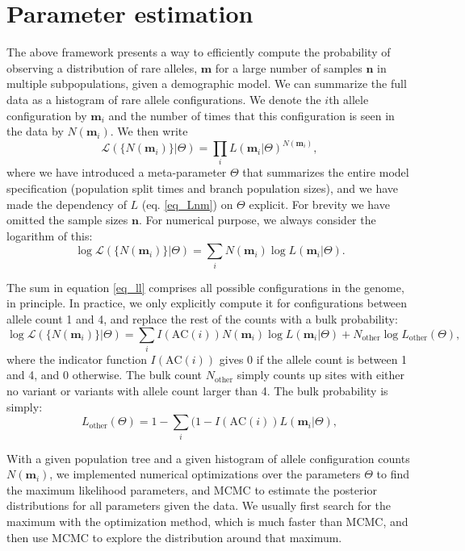 \documentclass[a4paper]{article}
\begin{document}
\section{Parameter estimation}
The above framework presents a way to efficiently compute the probability of observing a distribution of rare alleles, $\mathbf{m}$ for a large number of samples $\mathbf{n}$ in multiple subpopulations, given a demographic model. We can summarize the full data as a histogram of rare allele configurations. We denote the $i$th allele configuration by $\mathbf{m}_i$ and the number of times that this configuration is seen in the data by $N(\mathbf{m}_i)$. We then write
\begin{equation}
	\mathcal{L}(\{N(\mathbf{m}_i)\}|\Theta) = \prod_i L(\mathbf{m}_i|\Theta)^{N(\mathbf{m}_i)},
\end{equation}
where we have introduced a meta-parameter $\Theta$ that summarizes the entire model specification (population split times and branch population sizes), and we have made the dependency of $L$ (eq. \ref{eq_Lnm}) on $\Theta$ explicit. For brevity we have omitted the sample sizes $\mathbf{n}$. For numerical purpose, we always consider the logarithm of this:
\begin{equation}
    \label{eq_ll}
	\log\mathcal{L}(\{N(\mathbf{m}_i)\}|\Theta) = \sum_i N(\mathbf{m}_i) \log L(\mathbf{m}_i|\Theta).
\end{equation}

The sum in equation \ref{eq_ll} comprises all possible configurations in the genome, in principle. In practice, we only explicitly compute it for configurations between allele count 1 and 4, and replace the rest of the counts with a bulk probability:
\begin{equation}
    \label{eq_ll2}
	\log\mathcal{L}(\{N(\mathbf{m}_i)\}|\Theta) = \sum_i I(\mathrm{AC}(i)) N(\mathbf{m}_i) \log L(\mathbf{m}_i|\Theta) + N_\mathrm{other} \log L_\mathrm{other}(\Theta),
\end{equation}
where the indicator function $I(\mathrm{AC}(i))$ gives 0 if the allele count is between 1 and 4, and $0$ otherwise. The bulk count $N_\mathrm{other}$ simply counts up sites with either no variant or variants with allele count larger than 4. The bulk probability is simply:
\begin{equation}
    L_\mathrm{other}(\Theta) = 1 - \sum_i (1 - I(\mathrm{AC}(i)) L(\mathbf{m}_i|\Theta),
\end{equation}

With a given population tree and a given histogram of allele configuration counts $N(\mathbf{m}_i)$, we implemented numerical optimizations over the parameters $\Theta$ to find the maximum likelihood parameters, and MCMC to estimate the posterior distributions for all parameters given the data. We usually first search for the maximum with the optimization method, which is much faster than MCMC, and then use MCMC to explore the distribution around that maximum.
\end{document}
